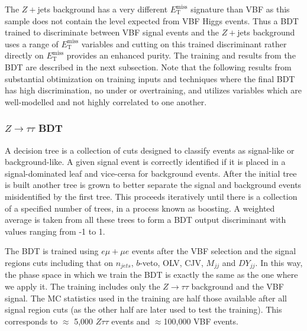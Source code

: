
The $Z+$jets background has a very different $E_{\text{T}}^{\text{miss}}$ signature than VBF as this sample does not contain the level expected from VBF Higgs events. Thus a BDT trained to discriminate between VBF signal events and the $Z+$jets background uses a range of $E_{\text{T}}^{\text{miss}}$ variables and cutting on this trained discriminant rather directly on $E_{\text{T}}^{\text{miss}}$ provides an enhanced purity. The training and results from the BDT are described in the next subsection. Note that the following results from substantial obtimization on training inputs and techniques where the final BDT has high discrimination, no under or overtraining, and utilizes variables which are well-modelled and not highly correlated to one another.  

\subsubsection{$Z\rightarrow\tau\tau$ BDT}
A decision tree is a collection of cuts designed to classify events as signal-like or background-like. A given signal event is correctly identified if it is placed in a signal-dominated leaf and vice-cersa for background events. After the initial tree is built another tree is grown to better separate the signal and background events misidentified by the first tree. This proceeds iteratively until there is a collection of a specified number of trees, in a process known as boosting. A weighted average is taken from all these trees to form a BDT output discriminant with values ranging from -1 to 1.

The BDT is trained using $e\mu+\mu e$ events after the VBF selection and the signal regions cuts including that on $n_{jets}$, $b$-veto, OLV, CJV, $M_{jj}$ and $DY_{jj}$. In this way, the phase space in which we train the BDT is exactly the same as the one where we apply it. The training includes only the $Z\rightarrow\tau\tau$ background and the VBF signal. The MC statistics used in the training are half those available after all signal region cuts (as the other half are later used to test the training). This corresponds to $\approx$ 5,000 $Z\tau\tau$ events and $\approx$100,000 VBF events.

